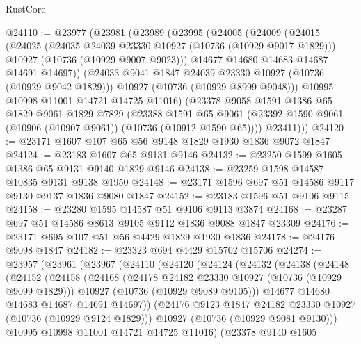 \begin{lexlean}{RustCore}
\begin{coremodule}
@24110 := @23977
    (@23981
      (@23989
        (@23995
          (@24005
            (@24009
              (@24015
                (@24025
                  (@24035 @24039 @23330 @10927 (@10736 (@10929 @9017 @1829)))
                  @10927
                  (@10736 (@10929 @9007 @9023)))
                @14677
                @14680
                @14683
                @14687
                @14691
                @14697))
            (@24033 @9041 @1847 @24039 @23330 @10927 (@10736 (@10929 @9042 @1829)))
            @10927
            (@10736 (@10929 @8999 @9048)))
          @10995
          @10998
          @11001
          @14721
          @14725
          @11016)
        (@23378
          @9058
          @1591
          @1386
          @65
          @1829
          @9061
          @1829
          @7829
          (@23388
            @1591
            @65
            @9061
            (@23392 @1590 @9061 (@10906 (@10907 @9061)) (@10736 (@10912 @1590 @65))))
          @23411)))
@24120 := @23171 @1607 @107 @65 @56 @9148 @1829 @1930 @1836 @9072 @1847
@24124 := @23183 @1607 @65 @9131 @9146
@24132 := @23250 @1599 @1605 @1386 @65 @9131 @9140 @1829 @9146
@24138 := @23259 @1598 @14587 @10835 @9131 @9138 @1950
@24148 := @23171 @1596 @697 @51 @14586 @9117 @9130 @9137 @1836 @9080 @1847
@24152 := @23183 @1596 @51 @9106 @9115
@24158 := @23280 @1595 @14587 @51 @9106 @9113 @3874
@24168 := @23287 @697 @51 @14586 @8613 @9105 @9112 @1836 @9088 @1847 @23309
@24176 := @23171 @695 @107 @51 @56 @4429 @1829 @1930 @1836
@24178 := @24176 @9098 @1847
@24182 := @23323 @694 @4429 @15702 @15706
@24274 := @23957
    (@23961
      (@23967
        (@24110
          (@24120
            (@24124
              (@24132
                (@24138
                  (@24148
                    (@24152
                      (@24158
                        (@24168
                          (@24178 @24182 @23330 @10927 (@10736 (@10929 @9099 @1829)))
                          @10927
                          (@10736 (@10929 @9089 @9105)))
                        @14677
                        @14680
                        @14683
                        @14687
                        @14691
                        @14697))
                    (@24176 @9123 @1847 @24182 @23330 @10927 (@10736 (@10929 @9124 @1829)))
                    @10927
                    (@10736 (@10929 @9081 @9130)))
                  @10995
                  @10998
                  @11001
                  @14721
                  @14725
                  @11016)
                (@23378
                  @9140
                  @1605

\end{coremodule}
\end{lexlean}
